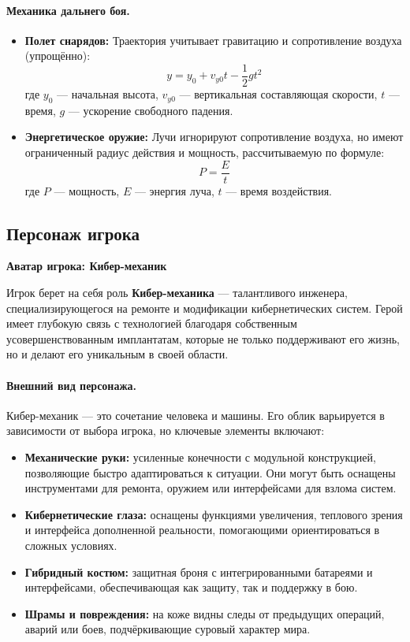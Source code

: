 \documentclass{article}
\begin{document}
\paragraph{Механика дальнего боя.}
\begin{itemize}
    \item \textbf{Полет снарядов:} Траектория учитывает гравитацию и сопротивление воздуха (упрощённо):
    \[
    y = y_0 + v_{y0} t - \frac{1}{2} g t^2
    \]
    где \(y_0\) — начальная высота, \(v_{y0}\) — вертикальная составляющая скорости, \(t\) — время, \(g\) — ускорение свободного падения.
    \item \textbf{Энергетическое оружие:} Лучи игнорируют сопротивление воздуха, но имеют ограниченный радиус действия и мощность, рассчитываемую по формуле:
    \[
    P = \frac{E}{t}
    \]
    где \(P\) — мощность, \(E\) — энергия луча, \(t\) — время воздействия.
\end{itemize}

\subsection{Персонаж игрока}

\textbf{Аватар игрока: Кибер-механик}

Игрок берет на себя роль \textbf{Кибер-механика} — талантливого инженера, специализирующегося на ремонте и модификации кибернетических систем. Герой имеет глубокую связь с технологией благодаря собственным усовершенствованным имплантатам, которые не только поддерживают его жизнь, но и делают его уникальным в своей области. 

\paragraph{Внешний вид персонажа.}
Кибер-механик — это сочетание человека и машины. Его облик варьируется в зависимости от выбора игрока, но ключевые элементы включают:
\begin{itemize}
    \item \textbf{Механические руки:} усиленные конечности с модульной конструкцией, позволяющие быстро адаптироваться к ситуации. Они могут быть оснащены инструментами для ремонта, оружием или интерфейсами для взлома систем.
    \item \textbf{Кибернетические глаза:} оснащены функциями увеличения, теплового зрения и интерфейса дополненной реальности, помогающими ориентироваться в сложных условиях.
    \item \textbf{Гибридный костюм:} защитная броня с интегрированными батареями и интерфейсами, обеспечивающая как защиту, так и поддержку в бою.
    \item \textbf{Шрамы и повреждения:} на коже видны следы от предыдущих операций, аварий или боев, подчёркивающие суровый характер мира.
\end{itemize}
\end{document}
